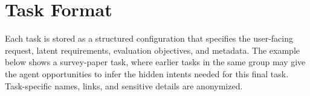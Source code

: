 

\section{Task Format}
\label{app:task_format}

Each task is stored as a structured configuration that specifies the user-facing request, latent requirements, evaluation objectives, and metadata. The example below shows a survey-paper task, where earlier tasks in the same group may give the agent opportunities to infer the hidden intents needed for this final task. Task-specific names, links, and sensitive details are anonymized.

